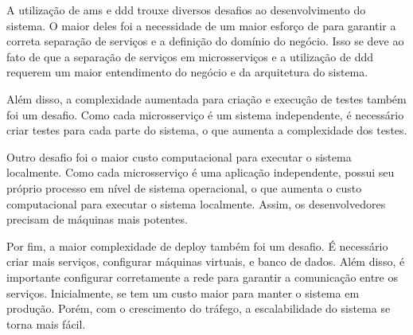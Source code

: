 A utilização de \acrfull{ams} e \acrfull{ddd} trouxe diversos desafios ao desenvolvimento do sistema. O maior deles foi a necessidade de um maior esforço de  para garantir a correta separação de serviços e a definição do domínio do negócio. Isso se deve ao fato de que a separação de serviços em microsserviços e a utilização de \acrfull{ddd} requerem um maior entendimento do negócio e da arquitetura do sistema.

Além disso, a complexidade aumentada para criação e execução de testes também foi um desafio. Como cada microsserviço é um sistema independente, é necessário criar testes para cada parte do sistema, o que aumenta a complexidade dos testes.

Outro desafio foi o maior custo computacional para executar o sistema localmente. Como cada microsserviço é uma aplicação independente, possui seu próprio processo em nível de sistema operacional, o que aumenta o custo computacional para executar o sistema localmente. Assim, os desenvolvedores precisam de máquinas mais potentes.

Por fim, a maior complexidade de deploy também foi um desafio. É necessário criar mais serviços, configurar máquinas virtuais,  e banco de dados. Além disso, é importante configurar corretamente a rede para garantir a comunicação entre os serviços. Inicialmente, se tem um custo maior para manter o sistema em produção. Porém, com o crescimento do tráfego, a escalabilidade do sistema se torna mais fácil.